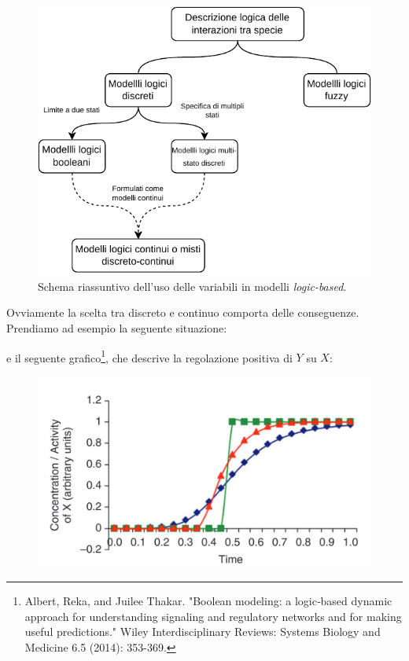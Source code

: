 \documentclass[a4paper,12pt, oneside]{book}
\begin{document}
\begin{figure}
  \centering
  \includegraphics[scale = 1]{img/log.pdf}
  \caption{Schema riassuntivo dell'uso delle variabili in modelli
    \textit{logic-based}.}
  \label{fig:log2}
\end{figure}
\newpage
\noindent
Ovviamente la scelta tra discreto e continuo comporta delle
conseguenze. Prendiamo ad esempio la seguente situazione:
\begin{center}
\end{center}
e il seguente grafico\footnote{Albert, Reka, and
  Juilee Thakar. "Boolean modeling: a logic‐based dynamic approach for
  understanding signaling and regulatory networks and for making useful
  predictions." Wiley Interdisciplinary Reviews: Systems Biology and Medicine
  6.5 (2014): 353-369.}, che descrive la regolazione positiva di $Y$ su $X$: 
\begin{figure}[H]
  \centering
  \includegraphics[scale = 0.2]{img/boolf.jpg}
\end{figure}
\end{document}
